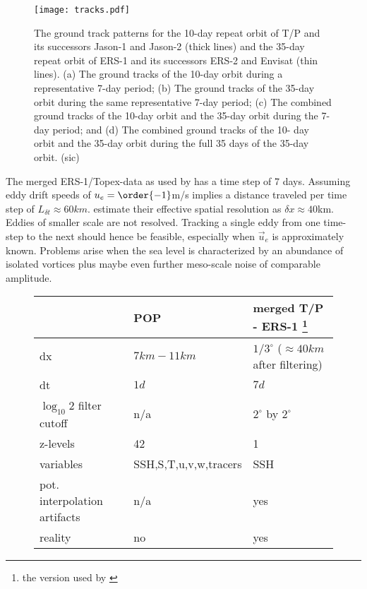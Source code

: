 \begin{figure}[h]
\texttt{[image: tracks.pdf]}
\caption{{The ground track patterns for the 10-day repeat orbit of T/P and its successors Jason-1 and Jason-2 (thick lines) and the 35-day repeat orbit of ERS-1 and its successors ERS-2 and Envisat (thin lines). (a) The ground tracks of the 10-day orbit during a representative 7-day period; (b) The ground tracks of the 35-day orbit during the same representative 7-day period; (c) The combined ground tracks of the 10-day orbit and the 35-day orbit during the 7-day period; and (d) The combined ground tracks of the 10- day orbit and the 35-day orbit during the full 35 days of the 35-day orbit. (sic)} \cite{Chelton2011}}
\end{figure}


The merged ERS-1/Topex-data as used by \cite{Chelton2011} has a time step of 7 days. Assuming eddy drift speeds of $u_e=\order{-1}$m/s implies a distance traveled per time step of $L_{\delta t}\approx 60km$. \citeauthor{Chelton2011} estimate their effective spatial resolution as $\delta x \approx 40$km. Eddies of smaller scale are not resolved. Tracking a single eddy from one time-step to the next should hence be feasible, especially when $\vec{u}_e$ is approximately known. Problems arise when the sea level is characterized by an abundance of isolated vortices plus maybe even further meso-scale noise of comparable amplitude.
\begin{figure}
\begin{tabularx}{\textwidth}{ |X|X|X| }
  \hline
   & \bf{POP} & \bf{merged T/P - ERS-1 \footnote{the version used by \cite{Chelton2011}}}  \\
  \hline
  dx & $7km-11km$  & $1/3^{\circ}$ ($\approx 40 km$ after filtering)  \\
  \hline
  dt & $1d$  & $7d$  \\
  \hline
  $\log_{10}2$ filter cutoff & n/a  & $2^{\circ} $ by $ 2^{\circ} $  \\
  \hline
  z-levels & 42  & 1  \\
  \hline
  variables & SSH,S,T,u,v,w,tracers  & SSH  \\
  \hline
	pot. interpolation artifacts & n/a  & yes  \\
  \hline
	reality & no  & yes  \\
  \hline
\end{tabularx}
\end{figure}

